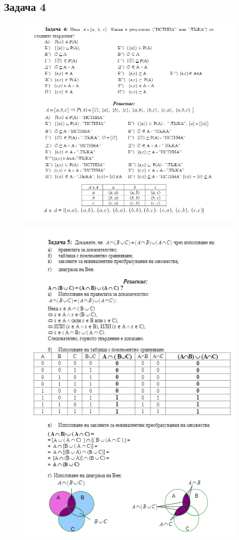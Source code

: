 \documentclass[fleqn, 12pt]{article}
\theoremstyle{definition}
\begin{document}
\subsection*{Задача 4}
\begin{figure}[h!]
\includegraphics{Pics/ex3-task4.png}
\end{figure}
\newpage
\begin{figure}[h!]
\includegraphics{Pics/ex3-task5.png}
\end{figure}
\end{document}
